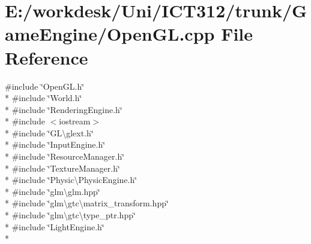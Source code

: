 \section{E\+:/workdesk/\+Uni/\+I\+C\+T312/trunk/\+Game\+Engine/\+Open\+G\+L.cpp File Reference}
\label{_open_g_l_8cpp}
{\ttfamily \#include \char`\"{}Open\+G\+L.\+h\char`\"{}}\\*
{\ttfamily \#include \char`\"{}World.\+h\char`\"{}}\\*
{\ttfamily \#include \char`\"{}Rendering\+Engine.\+h\char`\"{}}\\*
{\ttfamily \#include $<$iostream$>$}\\*
{\ttfamily \#include \char`\"{}G\+L\textbackslash{}glext.\+h\char`\"{}}\\*
{\ttfamily \#include \char`\"{}Input\+Engine.\+h\char`\"{}}\\*
{\ttfamily \#include \char`\"{}Resource\+Manager.\+h\char`\"{}}\\*
{\ttfamily \#include \char`\"{}Texture\+Manager.\+h\char`\"{}}\\*
{\ttfamily \#include \char`\"{}Physic\textbackslash{}\+Physic\+Engine.\+h\char`\"{}}\\*
{\ttfamily \#include \char`\"{}glm\textbackslash{}glm.\+hpp\char`\"{}}\\*
{\ttfamily \#include \char`\"{}glm\textbackslash{}gtc\textbackslash{}matrix\+\_\+transform.\+hpp\char`\"{}}\\*
{\ttfamily \#include \char`\"{}glm\textbackslash{}gtc\textbackslash{}type\+\_\+ptr.\+hpp\char`\"{}}\\*
{\ttfamily \#include \char`\"{}Light\+Engine.\+h\char`\"{}}\\*

